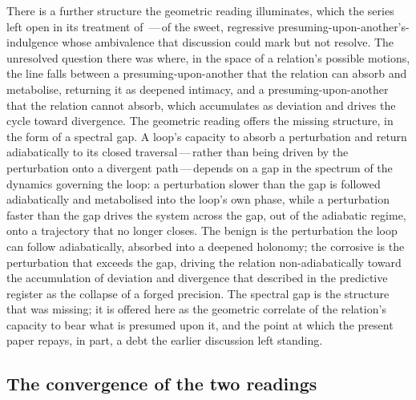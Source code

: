 There is a further structure the geometric reading illuminates, which the series left open in its treatment of \,---\,of the sweet, regressive presuming-upon-another's-indulgence whose ambivalence that discussion could mark but not resolve. The unresolved question there was where, in the space of a relation's possible motions, the line falls between a presuming-upon-another that the relation can absorb and metabolise, returning it as deepened intimacy, and a presuming-upon-another that the relation cannot absorb, which accumulates as deviation and drives the cycle toward divergence. The geometric reading offers the missing structure, in the form of a spectral gap. A loop's capacity to absorb a perturbation and return adiabatically to its closed traversal\,---\,rather than being driven by the perturbation onto a divergent path\,---\,depends on a gap in the spectrum of the dynamics governing the loop: a perturbation slower than the gap is followed adiabatically and metabolised into the loop's own phase, while a perturbation faster than the gap drives the system across the gap, out of the adiabatic regime, onto a trajectory that no longer closes. The benign  is the perturbation the loop can follow adiabatically, absorbed into a deepened holonomy; the corrosive  is the perturbation that exceeds the gap, driving the relation non-adiabatically toward the accumulation of deviation and divergence that  described in the predictive register as the collapse of a forged precision. The spectral gap is the structure that was missing; it is offered here as the geometric correlate of the relation's capacity to bear what is presumed upon it, and the point at which the present paper repays, in part, a debt the earlier discussion left standing.

\subsection{The convergence of the two readings}
\label{p13:sub:holo-convergence}

